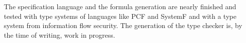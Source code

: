 \documentclass{acm_proc_article-sp}
\begin{document}
The specification language and the formula generation are nearly
finished and tested with type systems of languages like PCF and
SystemF and with a type system from information flow security. The
generation of the type checker is, by the time of writing, work in
progress.
{} 
\end{document}
